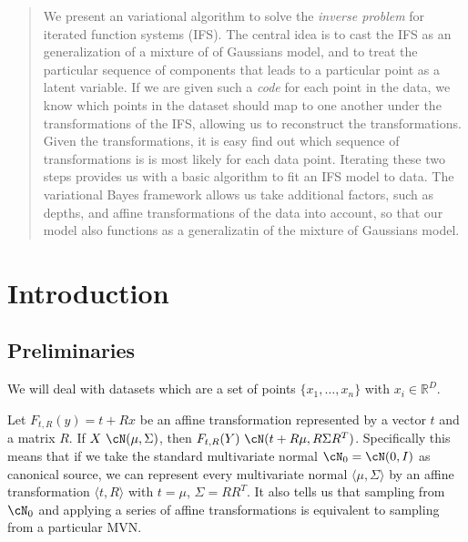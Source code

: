 
\begin{abstract}
\noindent We present an variational algorithm to solve the \emph{inverse problem} for iterated function systems (IFS). The central idea is to cast the IFS as an generalization of a mixture of of Gaussians model, and to treat the particular sequence of components that leads to a particular point as a latent variable. If we are given such a \emph{code} for each point in the data, we know which points in the dataset should map to one another under the transformations of the IFS, allowing us to reconstruct the transformations. Given the transformations, it is easy find out which sequence of transformations is is most likely for each data point. Iterating these two steps provides us with a basic algorithm to fit an IFS model to data. The variational Bayes framework allows us take additional factors, such as depths, and affine transformations of the data into account, so that our model also functions as a generalizatin of the mixture of Gaussians model.
\end{abstract}
\section{Introduction}



\subsection{Preliminaries}
We will deal with datasets which are a set of points $\{x_1, \ldots, x_n\}$ with $x_i \in \mathbb{R}^D$.

Let $F_{t, R}(y) = t + Rx$ be an affine transformation represented by a vector $t$ and a matrix $R$. If $X ~ \cN(\mu, \Sigma)$, then $F_{t, R}(Y) ~ \cN(t + R\mu, R\Sigma R^T)$. Specifically this means that if we take the standard multivariate normal $\cN_0 = \cN(0, I)$ as  canonical source, we can represent every multivariate normal $\langle \mu, \Sigma \rangle$ by an affine transformation $\langle t, R \rangle$ with $t = \mu$, $\Sigma = RR^T$. It also tells us that sampling from $\cN_0$ and applying a series of affine transformations is equivalent to sampling from a particular MVN.

